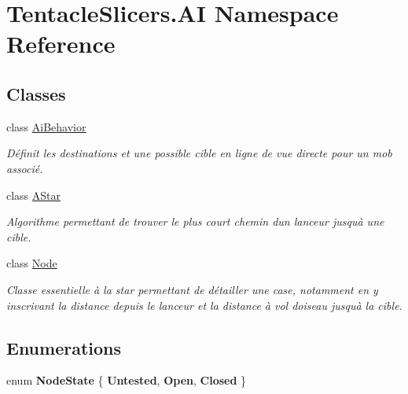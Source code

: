 \hypertarget{namespace_tentacle_slicers_1_1_a_i}{}\section{Tentacle\+Slicers.\+AI Namespace Reference}
\label{namespace_tentacle_slicers_1_1_a_i}
\subsection*{Classes}
\begin{DoxyCompactItemize}
\item 
class \hyperlink{class_tentacle_slicers_1_1_a_i_1_1_ai_behavior}{Ai\+Behavior}
\begin{DoxyCompactList}\small\item\em Définit les destinations et une possible cible en ligne de vue directe pour un mob associé. \end{DoxyCompactList}\item 
class \hyperlink{class_tentacle_slicers_1_1_a_i_1_1_a_star}{A\+Star}
\begin{DoxyCompactList}\small\item\em Algorithme permettant de trouver le plus court chemin d\textquotesingle{}un lanceur jusqu\textquotesingle{}à une cible. \end{DoxyCompactList}\item 
class \hyperlink{class_tentacle_slicers_1_1_a_i_1_1_node}{Node}
\begin{DoxyCompactList}\small\item\em Classe essentielle à l\textquotesingle{}a star permettant de détailler une case, notamment en y inscrivant la distance depuis le lanceur et la distance à vol d\textquotesingle{}oiseau jusqu\textquotesingle{}à la cible. \end{DoxyCompactList}\end{DoxyCompactItemize}
\subsection*{Enumerations}
\begin{DoxyCompactItemize}
\item 
\mbox{\label{namespace_tentacle_slicers_1_1_a_i_abb168b3f270b2e03f4fd7bcd38f74dc3}} 
enum {\bfseries Node\+State} \{ {\bfseries Untested}, 
{\bfseries Open}, 
{\bfseries Closed}
 \}
\end{DoxyCompactItemize}
